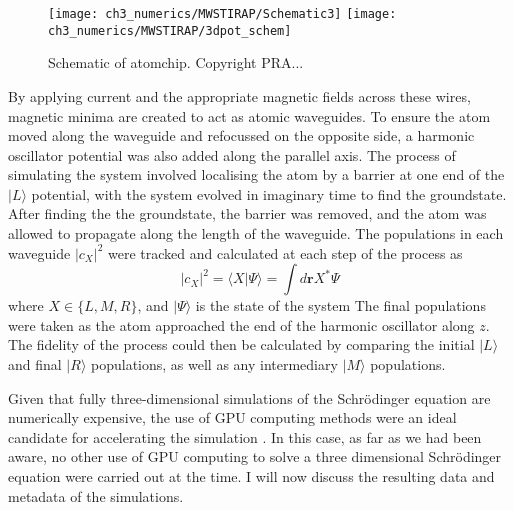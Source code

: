 \begin{figure}[tb]
    \centering
  \texttt{[image: ch3\_numerics/MWSTIRAP/Schematic3]}
  \texttt{[image: ch3\_numerics/MWSTIRAP/3dpot\_schem]}
  \caption{Schematic of atomchip. Copyright PRA...}
  \label{fig:schematic_atomchip}
\end{figure}
\iffalse
\begin{figure}[tb]
    \centering
  \texttt{[image: ch3\_numerics/MWSTIRAP/3dpot\_schem]}
  \caption{Schematic of atomchip potentials. Copyright PRA...}
  \label{fig:potschematic}
\end{figure}
\fi


\iffalse
\begin{figure}[tb]
    \centering
  \texttt{[image: ch3\_numerics/MWSTIRAP/Potential.pdf]}
  \caption[Isosurface of the magnetic fields.]{The additive nature of the magnetic fields are shown by the bulging of the fields close to the central region of the device.}
  \label{fig:mag_max_3d}
\end{figure}
\fi

By applying current and the appropriate magnetic fields across these wires, magnetic minima are created to act as atomic waveguides. To ensure the atom moved along the waveguide and refocussed on the opposite side, a harmonic oscillator potential was also added along the parallel axis. The process of simulating the system involved localising the atom by a barrier at one end of the $|L\rangle$ potential, with the system evolved in imaginary time to find the groundstate. After finding the the groundstate, the barrier was removed, and the atom was allowed to propagate along the length of the waveguide. The populations in each waveguide $|c_{X}|^2$ were tracked and calculated at each step of the process as
\begin{equation}
    |c_X|^2 = \langle X |\Psi \rangle = \int d\mathbf{r} X^{*} \Psi
\end{equation}
where $X \in \{L,M,R\}$, and $| \Psi \rangle$ is the state of the system
The final populations were taken as the atom approached the end of the harmonic oscillator along $z$. The fidelity of the process could then be calculated by comparing the initial $| L \rangle$ and final $|R \rangle$ populations, as well as any intermediary $| M \rangle$ populations.

Given that fully three-dimensional simulations of the Schr\"odinger equation are numerically expensive, the use of GPU computing methods were an ideal candidate for accelerating the simulation \cite{Bauke:11}. In this case, as far as we had been aware, no other use of GPU computing to solve a three dimensional Schr\"odinger equation were carried out at the time. I will now discuss the resulting data and metadata of the simulations.


